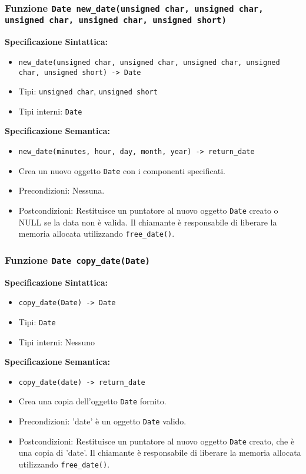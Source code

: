\documentclass[11pt]{scrartcl} %
\begin{document}
\subsubsection{Funzione \texttt{Date new\_date(unsigned char, unsigned char, unsigned char, unsigned char, unsigned short) }}

\textbf{Specificazione Sintattica:}
\begin{itemize}
	\item \texttt{new\_date(unsigned char, unsigned char, unsigned char, unsigned char, unsigned short) -> Date}
	\item Tipi: \texttt{unsigned char}, \texttt{unsigned short}
	\item Tipi interni: \texttt{Date}
\end{itemize}

\textbf{Specificazione Semantica:}
\begin{itemize}
	\item \texttt{new\_date(minutes, hour, day, month, year) -> return\_date}
	\item Crea un nuovo oggetto \texttt{Date} con i componenti specificati.
	\item Precondizioni: Nessuna.
	\item Postcondizioni: Restituisce un puntatore al nuovo oggetto \texttt{Date} creato o NULL se la data non è valida. Il chiamante è responsabile di liberare la memoria allocata utilizzando \texttt{free\_date()}.
\end{itemize}

\subsubsection{Funzione \texttt{Date copy\_date(Date)}}

\textbf{Specificazione Sintattica:}
\begin{itemize}
	\item \texttt{copy\_date(Date) -> Date}
	\item Tipi: \texttt{Date}
	\item Tipi interni: Nessuno
\end{itemize}

\textbf{Specificazione Semantica:}
\begin{itemize}
	\item \texttt{copy\_date(date) -> return\_date}
	\item Crea una copia dell'oggetto \texttt{Date} fornito.
	\item Precondizioni: 'date' è un oggetto \texttt{Date} valido.
	\item Postcondizioni: Restituisce un puntatore al nuovo oggetto \texttt{Date} creato, che è una copia di 'date'. Il chiamante è responsabile di liberare la memoria allocata utilizzando \texttt{free\_date()}.
\end{itemize}
\end{document}

